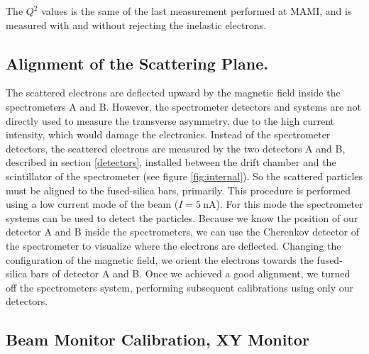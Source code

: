 The $Q^{2}$ values is the same of the last measurement performed at MAMI, and is measured with and without rejecting the inelastic electrons. 

\subsection{Alignment of the Scattering Plane.}

The scattered electrons are deflected upward by the magnetic field inside the spectrometers A and B. However, the spectrometer detectors and systems are not directly used to measure the transverse asymmetry, due to the high current intensity, which would damage the electronics.
Instead of the spectrometer detectors, the scattered electrons are measured by the two detectors A and B, described in section \ref{detectors}, installed between the drift chamber and the scintillator of the spectrometer (see figure \ref{fig:internal}). So the scattered particles must be aligned to the fused-silica bars, primarily.
This procedure is performed using a low current mode of the beam ($I = \SI{5}{\nano \ampere}$). For this mode the spectrometer systems can be used to detect the particles. Because we know the position of our detector A and B inside the spectrometers, we can use the Cherenkov detector of the spectrometer to visualize where the electrons are deflected. Changing the configuration of the magnetic field, we orient the electrons towards the fused-silica bars of detector A and B. Once we achieved a good alignment, we turned off the spectrometers system, performing subsequent calibrations using only our detectors. 

\subsection{Beam Monitor Calibration, XY Monitor}

